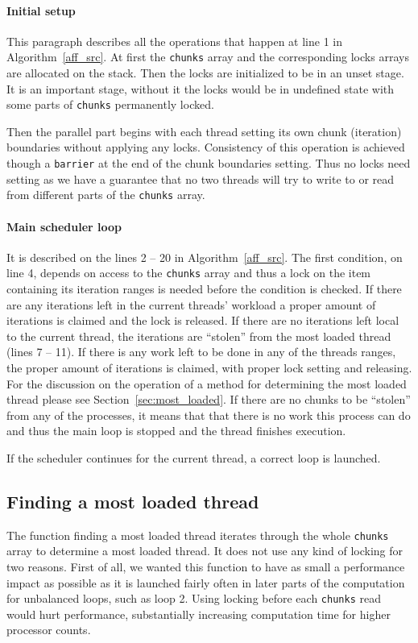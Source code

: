 \documentclass[11pt,a4paper]{article}
\begin{document}
\paragraph{Initial setup}
This paragraph describes all the operations that happen at line 1 in Algorithm~\ref{aff_src}.
At first the \texttt{chunks} array and the corresponding locks arrays are allocated on the stack. 
Then the locks are initialized to be in an unset stage.
It is an important stage, without it the locks would be in undefined state with some parts of \texttt{chunks} permanently locked.

Then the parallel part begins with each thread setting its own chunk (iteration) boundaries without applying any locks.
Consistency of this operation is achieved though a \texttt{barrier} at the end of the chunk boundaries setting.
Thus no locks need setting as we have a guarantee that no two threads will try to write to or read from different parts of the \texttt{chunks} array.

\paragraph{Main scheduler loop}
It is described on the lines 2 -- 20 in Algorithm~\ref{aff_src}. 
The first condition, on line 4, depends on access to the \texttt{chunks} array and thus a lock on the item containing its iteration ranges is needed before the condition is checked.
If there are any iterations left in the current threads' workload a proper amount of iterations is claimed and the lock is released.
If there are no iterations left local to the current thread, the iterations are ``stolen'' from the most loaded thread (lines 7 -- 11).
If there is any work left to be done in any of the threads ranges, the proper amount of iterations is claimed, with proper lock setting and releasing.
For the discussion on the operation of a method for determining the most loaded thread please see Section~\ref{sec:most_loaded}.
If there are no chunks to be ``stolen'' from any of the processes, it means that that there is no work this process can do and thus the main loop is stopped and the thread finishes execution.

If the scheduler continues for the current thread, a correct loop is launched.

\subsection{Finding a most loaded thread}
The function finding a most loaded thread iterates through the whole \texttt{chunks} array to determine a most loaded thread.
It does not use any kind of locking for two reasons. 
First of all, we wanted this function to have as small a performance impact as possible as it is launched fairly often in later parts of the computation for unbalanced loops, such as loop 2.
Using locking before each \texttt{chunks} read would hurt performance, substantially increasing computation time for higher processor counts.
\end{document}
